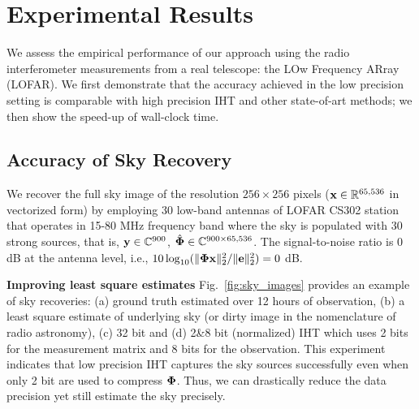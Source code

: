 \documentclass{article}
\begin{document}
\vspace{-1em}
\section{Experimental Results}\label{section_experiments}
\vspace{-0.5em}

We assess the empirical performance of our approach using the radio interferometer measurements from a real telescope: the LOw Frequency ARray (LOFAR). We first demonstrate that the accuracy achieved in the low precision setting is comparable with high precision IHT and other state-of-art methods; we then show the speed-up
of wall-clock time.

\vspace{-0.5em}
\subsection{Accuracy of Sky Recovery}
\vspace{-1em}

We recover the full sky image of the resolution $256\times 256$ pixels (${\bf x} \in \mathbb{R}^{65,536}$ in vectorized form) by employing 30 low-band antennas of LOFAR CS302 station that operates in 15-80 MHz frequency band where the sky is populated with 30 strong sources, that is, ${\bf y} \in \mathbb{C}^{900}$, $\hat{\bf \Phi} \in \mathbb{C}^{900\times 65,536}$. The signal-to-noise ratio is 0 dB at the antenna level, i.e., $10\log_{10}(\|{\bf \Phi x}\|_2^2/\|{\bf e}\|_2^2) = 0$ dB. 

{\bf Improving least square estimates}
Fig.~\ref{fig:sky_images} provides an example of sky recoveries: (a) ground truth estimated over 12 hours of observation, (b) a least square estimate of underlying sky (or dirty image in the nomenclature of radio astronomy), (c) 32 bit and (d) 2\&8 bit (normalized) IHT which uses 2 bits for the measurement matrix and 8 bits for the observation. This experiment indicates that low precision IHT captures the sky sources successfully even when only 2 bit are used to compress ${\bf \Phi}$. Thus, we can drastically reduce the data precision yet still estimate the sky precisely.

\end{document}
